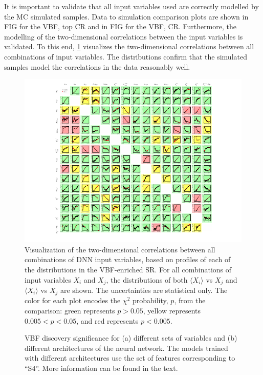 It is important to validate that all input variables used are correctly modelled by the MC simulated samples.
Data to simulation comparison plots are shown in FIG for the VBF, top CR and in FIG for the VBF, \Ztautau CR. 
Furthermore, the modelling of the two-dimensional correlations between the input variables is validated. 
To this end, \cref{fig:dnn-features-profiles} visualizes the two-dimensional correlations between all combinations of input variables.
The distributions confirm that the simulated samples model the correlations in the data reasonably well.  

\begin{figure}[t]
    \includegraphics[width=\textwidth,trim=45 0 45 0]{figures/hww/dnn/correlations_PROF_SR.pdf}
    \caption{Visualization of the two-dimensional correlations between all combinations of DNN input variables, based on profiles of each of the distributions in the VBF-enriched \TwoJet SR. For all combinations of input variables $X_i$ and $X_j$, the distributions of both $\langle X_i \rangle$ vs $X_j$ and $\langle X_i \rangle$ vs $X_j$ are shown. The uncertainties are statistical only. The color for each plot encodes the $\chi^2$ probability, $p$, from the comparison: green represents $p > 0.05$, yellow represents $0.005 < p < 0.05$, and red represents $p < 0.005$.}
    \label{fig:dnn-features-profiles}
\end{figure}


\begin{figure}[t]
    \caption{VBF discovery significance for (a) different sets of variables and (b) different architectures of the neural network. The models trained with different architectures use the set of features corresponding to ``S4''. More information can be found in the text.}
    \label{fig:arch-vars-optim}
\end{figure}

